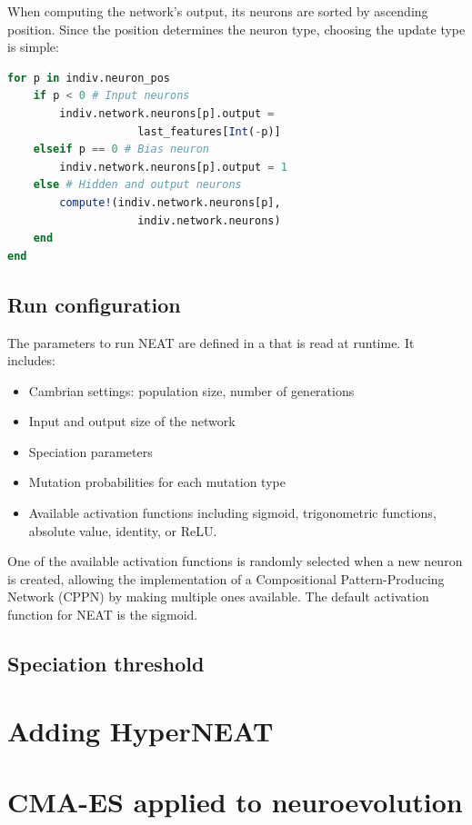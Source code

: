When computing the network's output, its neurons are sorted by ascending position. Since the position determines the neuron type, choosing the update type is simple:

\begin{lstlisting}[language=Julia, caption=NEAT network processing (\href{https://github.com/TemplierPaul/NeuroEvolution.jl/blob/master/src/process.jl}{\color{blue}{Source}})]
for p in indiv.neuron_pos
    if p < 0 # Input neurons
        indiv.network.neurons[p].output = 
                    last_features[Int(-p)]
    elseif p == 0 # Bias neuron
        indiv.network.neurons[p].output = 1
    else # Hidden and output neurons
        compute!(indiv.network.neurons[p], 
                    indiv.network.neurons)
    end
end
\end{lstlisting}

\subsection{Run configuration}

The parameters to run NEAT are defined in a \href{https://github.com/TemplierPaul/NeuroEvolution.jl/blob/master/cfg/test.yaml}{\color{blue}{YAML file}}  that is read at runtime. It includes:

\begin{itemize}
    \item Cambrian settings: population size, number of generations
    \item Input and output size of the network
    \item Speciation parameters
    \item Mutation probabilities for each mutation type
    \item Available activation functions including sigmoid, trigonometric functions, absolute value, identity, or ReLU. 
\end{itemize}

One of the available activation functions is randomly selected when a new neuron is created, allowing the implementation of a Compositional Pattern-Producing Network (CPPN) by making multiple ones available. The default activation function for NEAT is the sigmoid. 

\subsection{Speciation threshold}



\section{Adding HyperNEAT}

\section{CMA-ES applied to neuroevolution}

